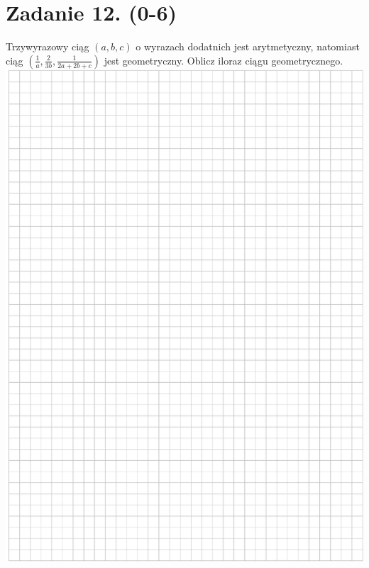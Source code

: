 \documentclass[10pt]{article}
\begin{document}
\section*{Zadanie 12. (0-6)}
Trzywyrazowy ciąg \((a, b, c)\) o wyrazach dodatnich jest arytmetyczny, natomiast ciąg \(\left(\frac{1}{a}, \frac{2}{3 b}, \frac{1}{2 a+2 b+c}\right)\) jest geometryczny. Oblicz iloraz ciągu geometrycznego.\\
\includegraphics[max width=\textwidth, center]{2024_11_21_9df891ea1c7ef9791261g-14}\\
\end{document}
